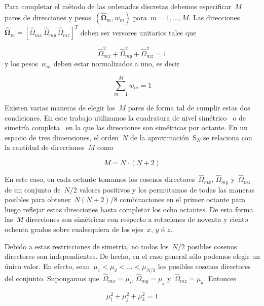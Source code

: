 Para completar el método de las ordenadas discretas debemos especificar~$M$ pares de direcciones y pesos~$(\boldsymbol{\hat\Omega}_m, w_m)$ para~$m=1,\dots,M$. Las direcciones~$\boldsymbol{\hat\Omega}_m = [\hat{\Omega}_{mx} \, \hat{\Omega}_{my} \, \hat{\Omega}_{mz}]^T$ deben ser versores unitarios tales que

\begin{equation}\label{eq:normalizaciondirecciones}
 \hat{\Omega}_{mx}^2 + \hat{\Omega}_{my}^2 + \hat{\Omega}_{mz}^2 = 1
\end{equation}
%
y los pesos~$w_m$ deben estar normalizados a uno, es decir

\begin{equation}\label{eq:normalizacionpesos}
 \sum_{m=1}^M w_m = 1
\end{equation}

\medskip

Existen varias maneras de elegir los~$M$ pares de forma tal de cumplir estas dos condiciones. En este trabajo utilizamos la cuadratura de nivel simétrico~\cite{lewis} o de simetría completa~\cite{stammler} en la que las direcciones son simétricas por octante. En un espacio de tres dimensiones, el orden~$N$ de la aproximación~S$_N$ se relaciona con la cantidad de direcciones~$M$ como

\begin{equation*}
 M = N\cdot(N+2)
\end{equation*}

En este caso, en cada octante tomamos los cosenos directores~$\hat{\Omega}_{mx}$, $\hat{\Omega}_{my}$ y~$\hat{\Omega}_{mz}$ de un conjunto de~$N/2$ valores positivos y los permutamos de todas las maneras posibles para obtener~$N(N+2)/8$ combinaciones en el primer octante para luego reflejar estas direcciones hasta completar los ocho octantes. De esta forma las~$M$ direcciones son simétricas con respecto a rotaciones de noventa y ciento ochenta grados sobre cualesquiera de los ejes~$x$, $y$ ó $z$.

Debido a estas restricciones de simetría, no todos los~$N/2$ posibles cosenos directores son independientes. De hecho, en el caso general sólo podemos elegir un único valor. En efecto, sean~$\mu_1 < \mu_2 < \dots < \mu_{N/2}$ los posibles cosenos directores del conjunto. Supongamos que~$\hat{\Omega}_{mx} = \mu_i$, $\hat{\Omega}_{my} = \mu_j$ y~$\hat{\Omega}_{mz} = \mu_k$. Entonces

\begin{equation}\label{eq:omega1}
 \mu_i^2 + \mu_j^2 + \mu_k^2 = 1
\end{equation}

